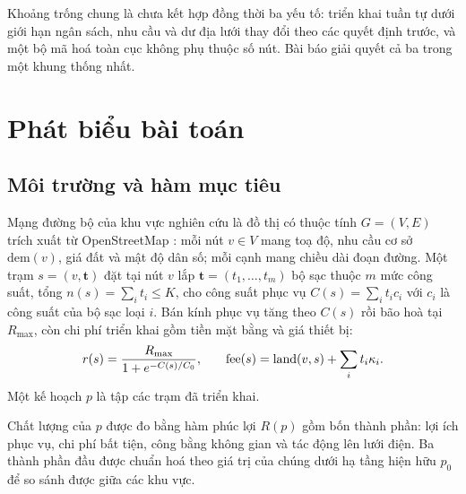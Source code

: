 \documentclass[10pt, conference, a4paper, compsocconf]{IEEEtran}
\begin{document}
Khoảng trống chung là chưa kết hợp đồng thời ba yếu tố: triển khai tuần tự dưới giới hạn ngân sách, nhu cầu và dư địa lưới thay đổi theo các quyết định trước, và một bộ mã hoá toàn cục không phụ thuộc số nút. Bài báo giải quyết cả ba trong một khung thống nhất.


\section{Phát biểu bài toán}
\label{sec:problem}

\subsection{Môi trường và hàm mục tiêu}

Mạng đường bộ của khu vực nghiên cứu là đồ thị có thuộc tính $G=(V,E)$ trích
xuất từ OpenStreetMap \cite{boeing2017osmnx}: mỗi nút $v\in V$ mang toạ độ, nhu
cầu cơ sở $\text{dem}(v)$, giá đất và mật độ dân số; mỗi cạnh mang chiều dài
đoạn đường. Một trạm $s=(v,\mathbf{t})$ đặt tại nút $v$ lắp
$\mathbf{t}=(t_1,\ldots,t_m)$ bộ sạc thuộc $m$ mức công suất, tổng
$n(s)=\sum_i t_i\le K$, cho công suất phục vụ $C(s)=\sum_i t_i c_i$ với $c_i$
là công suất của bộ sạc loại $i$. Bán kính phục vụ tăng theo $C(s)$ rồi bão hoà
tại $R_{\max}$, còn chi phí triển khai gồm tiền mặt bằng và giá thiết bị:
\begin{equation}\small
\label{eq:station}
r(s)=\frac{R_{\max}}{1+e^{-C(s)/C_0}},\qquad
\mathrm{fee}(s)=\mathrm{land}(v,s)+\sum_i t_i\kappa_i .
\end{equation}
Một kế hoạch $p$ là tập các trạm đã triển khai.

Chất lượng của $p$ được đo bằng hàm phúc lợi $R(p)$ gồm bốn thành phần: lợi ích
phục vụ, chi phí bất tiện, công bằng không gian và tác động lên lưới điện. Ba
thành phần đầu được chuẩn hoá theo giá trị của chúng dưới hạ tầng hiện hữu
$p_0$ để so sánh được giữa các khu vực.
\end{document}

